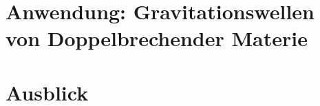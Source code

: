 \documentclass{beamer}
\begin{document}
    \section{Anwendung: Gravitationswellen von Doppelbrechender Materie}\label{sec:anwendung}


    \section{Ausblick}\label{sec:ausblick}
\end{document}
